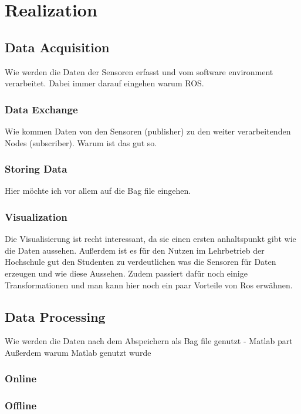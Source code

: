 \chapter{Realization}
\section{Data Acquisition}
	Wie werden die Daten der Sensoren erfasst und vom software environment verarbeitet. Dabei immer darauf eingehen warum ROS.
	\subsection{Data Exchange}
	Wie kommen Daten von den Sensoren (publisher) zu den weiter verarbeitenden Nodes (subscriber). Warum ist das gut so.
	\subsection{Storing Data}
	Hier möchte ich vor allem auf die Bag file eingehen.
\subsection{Visualization}
	Die Visualisierung ist recht interessant, da sie einen ersten anhaltspunkt gibt wie die Daten aussehen. Außerdem ist es für den Nutzen im Lehrbetrieb der Hochschule gut den Studenten zu verdeutlichen was die Sensoren für Daten erzeugen und wie diese Aussehen.
	Zudem passiert dafür noch einige Transformationen und man kann hier noch ein paar Vorteile von Ros erwähnen.
\section{Data Processing}
	Wie werden die Daten nach dem Abspeichern als Bag file genutzt - Matlab part
	Außerdem warum Matlab genutzt wurde
\subsection{Online}
\subsection{Offline}
